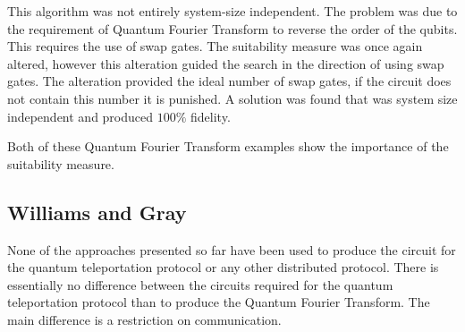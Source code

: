 This algorithm was not entirely system-size independent.
The problem was due to the requirement of Quantum Fourier Transform to reverse the order of the qubits.
This requires the use of swap gates.
The suitability measure was once again altered, however this alteration guided the search in the direction of using swap gates.
The alteration provided the ideal number of swap gates, if the circuit does not contain this number it is punished.
A solution was found that was system size independent and produced $100\%$ fidelity.

Both of these Quantum Fourier Transform examples show the importance of the suitability measure.

\subsection{Williams and Gray}
None of the approaches presented so far have been used to produce the circuit for the quantum teleportation protocol or any other distributed protocol.
There is essentially no difference between the circuits required for the quantum teleportation protocol than to produce the Quantum Fourier Transform.
The main difference is a restriction on communication.

